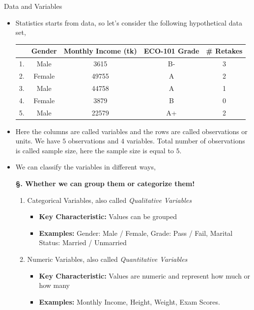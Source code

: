 \documentclass[8pt, usepdftitle=false]{beamer}
\begin{document}
\begin{frame}[allowframebreaks]{Data and Variables}
\begin{itemize}

\item Statistics starts from data, so let's consider the following hypothetical data set,

\begin{table}[H]
\begin{tabular}{l|c|c|c|c}
\hline
 & Gender & Monthly Income (tk) & ECO-101 Grade & \# Retakes\\
\hline
1. & Male & 3615 & B- & 3\\
\hline
2. & Female & 49755 & A & 2\\
\hline
3. & Male & 44758 & A & 1\\
\hline
4. & Female & 3879 & B & 0\\
\hline
5. & Male & 22579 & A+ & 2 \\
\hline
\end{tabular}
\end{table}


\item Here the columns are called \alert{variables} and the rows are called \alert{observations} or \alert{units}. We have $5$ observations and $4$ variables. Total number of observations is called \alert{sample size}, here the sample size is equal to $5$. 

\framebreak

\item We can classify the variables in different ways,

\bigskip

\textbf{\S. Whether we can group them or categorize them!}
\medskip
\begin{enumerate}
\item \alert{Categorical Variables}, also called \emph{Qualitative Variables}
\begin{itemize}
  \item  \textbf{Key Characteristic:} Values can be grouped 
  \item  \textbf{Examples:} Gender: Male / Female, Grade: Pass / Fail, Marital Status: Married / Unmarried
\end{itemize}
\medskip
\item \alert{Numeric Variables}, also called \emph{Quantitative Variables}
\begin{itemize}
  \item \textbf{Key Characteristic:} Values are numeric and represent how much or how many 
  \item  \textbf{Examples:} Monthly Income, Height, Weight, Exam Scores.
\end{itemize}
\medskip
\end{enumerate}



\end{itemize}
\end{frame}
\end{document}

